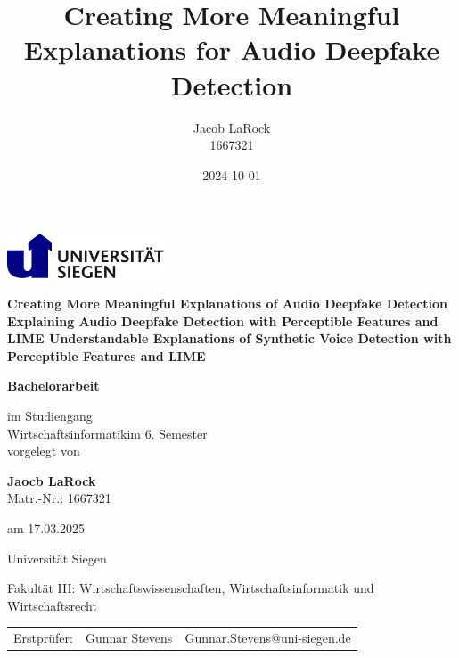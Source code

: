 \documentclass{article}
\title{Creating More Meaningful Explanations for Audio Deepfake Detection}
\date{2024-10-01}
\author{Jacob LaRock\\1667321}
\makeatletter
\def\Institute{Universität Siegen}
\def\KindOfWork{Bachelorarbeit}
\def\Studiengang{Wirtschaftsinformatik}
\def\Fakultaet{Fakultät III: Wirtschaftswissenschaften, Wirtschaftsinformatik und Wirtschaftsrecht}
\def\Title{
	Creating More Meaningful Explanations of Audio Deepfake Detection
	\newline\newline
	Explaining Audio Deepfake Detection with Perceptible Features and LIME
	\newline\newline
	Understandable Explanations of Synthetic Voice Detection with Perceptible Features and LIME
}
\def\Subtitle{}
\def\student{Jaocb LaRock}
\def\studentno{1667321}
\def\Date{17.03.2025}
\def\semester{6}
\def\erstpruefer{Gunnar Stevens}
\def\erstprueferMail{Gunnar.Stevens@uni-siegen.de}
\makeatother
\begin{document}
	\begin{titlepage}
        \begin{minipage}{0.9\linewidth}
			\centering
			\includegraphics [width=0.35\textwidth]{images/LogoSiegen}
        \end{minipage}

		\vspace{2cm}

		\centering

		{\Large\bfseries \Title\par}
		{\large\bfseries \Subtitle\par}
		\vspace{2cm}

		{\large \textbf{\KindOfWork}\par}

		\vspace{1.5cm}

		{\normalsize im Studiengang \\
			\Studiengang  im \semester. Semester \\
		}
		\vspace{0.5cm}
		{\normalsize vorgelegt von}
		\vspace{0.5cm}

		{\normalsize \textbf{\student} \\
			Matr.-Nr.: \studentno  \\}
		{am \normalsize \Date\par}

		\vspace{0.5cm}

		{\Institute} \par
		{\Fakultaet}\par

		\vspace{1cm}

    {\begin{table}[h]
			\centering
			\begin{tabular}{lll}
				{Erstprüfer:} & \erstpruefer & \erstprueferMail \\
			\end{tabular}
		\end{table}}     
		\vfill
	\end{titlepage}
    \newpage
\end{document}
